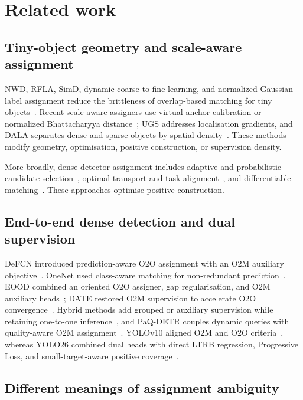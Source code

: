 \section{Related work}

\subsection{Tiny-object geometry and scale-aware assignment}

NWD, RFLA, SimD, dynamic coarse-to-fine learning, and normalized Gaussian label assignment reduce the brittleness of overlap-based matching for tiny objects~\cite{wang2021nwd,xu2022rfla,shi2024simd,xu2023dcfl,lin2026ngla}. Recent scale-aware assigners use virtual-anchor calibration or normalized Bhattacharyya distance~\cite{zhang2026vala,tian2026nbddla}; UGS addresses localisation gradients, and DALA separates dense and sparse objects by spatial density~\cite{sun2025ugs,liu2026dala}. These methods modify geometry, optimisation, positive construction, or supervision density.

More broadly, dense-detector assignment includes adaptive and probabilistic candidate selection~\cite{zhang2020atss,kim2020paa}, optimal transport and task alignment~\cite{ge2021ota,feng2021tood}, and differentiable matching~\cite{zhang2019freeanchor,zhu2020autoassign}. These approaches optimise positive construction.

\subsection{End-to-end dense detection and dual supervision}

DeFCN introduced prediction-aware O2O assignment with an O2M auxiliary objective~\cite{wang2021defcn}. OneNet used class-aware matching for non-redundant prediction~\cite{sun2021onenet}. EOOD combined an oriented O2O assigner, gap regularisation, and O2M auxiliary heads~\cite{zhang2025eood}; DATE restored O2M supervision to accelerate O2O convergence~\cite{chen2026date}. Hybrid methods add grouped or auxiliary supervision while retaining one-to-one inference~\cite{jia2023hdetr,chen2023groupdetr,zong2023codetr}, and PaQ-DETR couples dynamic queries with quality-aware O2M assignment~\cite{kang2026paqdetr}. YOLOv10 aligned O2M and O2O criteria~\cite{wang2024yolov10}, whereas YOLO26 combined dual heads with direct LTRB regression, Progressive Loss, and small-target-aware positive coverage~\cite{jocher2026yolo26}.

\subsection{Different meanings of assignment ambiguity}


